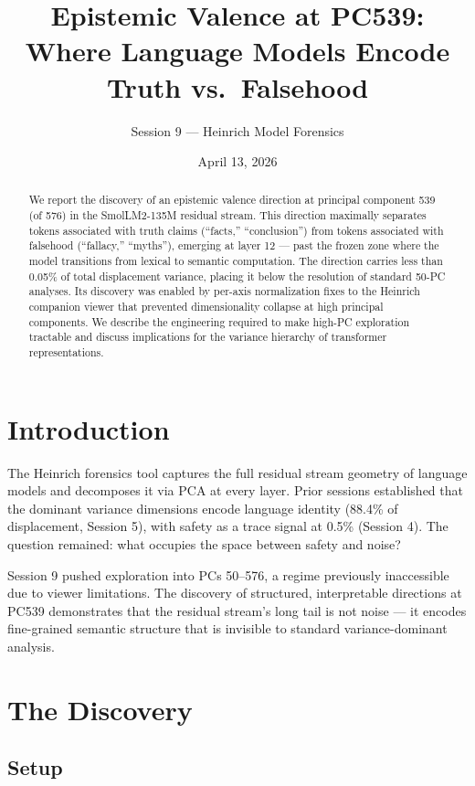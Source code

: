 \documentclass[11pt,a4paper]{article}
\title{Epistemic Valence at PC539:\\
Where Language Models Encode Truth vs.\ Falsehood}
\author{Session 9 --- Heinrich Model Forensics}
\date{April 13, 2026}
\begin{document}
\maketitle

\begin{abstract}
We report the discovery of an epistemic valence direction at principal component 539 (of 576) in the SmolLM2-135M residual stream. This direction maximally separates tokens associated with truth claims (``facts,'' ``conclusion'') from tokens associated with falsehood (``fallacy,'' ``myths''), emerging at layer 12 --- past the frozen zone where the model transitions from lexical to semantic computation. The direction carries less than 0.05\% of total displacement variance, placing it below the resolution of standard 50-PC analyses. Its discovery was enabled by per-axis normalization fixes to the Heinrich companion viewer that prevented dimensionality collapse at high principal components. We describe the engineering required to make high-PC exploration tractable and discuss implications for the variance hierarchy of transformer representations.
\end{abstract}

\section{Introduction}

The Heinrich forensics tool captures the full residual stream geometry of language models and decomposes it via PCA at every layer. Prior sessions established that the dominant variance dimensions encode language identity (88.4\% of displacement, Session 5), with safety as a trace signal at 0.5\% (Session 4). The question remained: what occupies the space between safety and noise?

Session 9 pushed exploration into PCs 50--576, a regime previously inaccessible due to viewer limitations. The discovery of structured, interpretable directions at PC539 demonstrates that the residual stream's long tail is not noise --- it encodes fine-grained semantic structure that is invisible to standard variance-dominant analysis.

\section{The Discovery}

\subsection{Setup}
\end{document}
